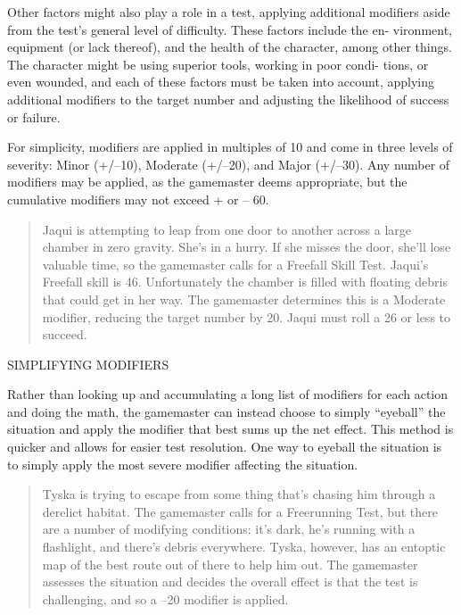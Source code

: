 Other factors might also play a
role in a test, applying additional
modifiers aside from the test's
general level of difficulty. These factors include the en-
vironment, equipment (or lack thereof), and the health
of the character, among other things. The character
might be using superior tools, working in poor condi-
tions, or even wounded, and each of these factors must
be taken into account, applying additional modifiers
to the target number and adjusting the likelihood of
success or failure.

For simplicity, modifiers are applied in multiples of
10 and come in three levels of severity: Minor (+/–10),
Moderate (+/–20), and Major (+/–30). Any number of
modifiers may be applied, as the gamemaster deems
appropriate, but the cumulative modifiers may not
exceed + or – 60.

\begin{quotation}
  Jaqui is attempting to leap from one door to another across a large
  chamber in zero gravity. She's in a hurry. If she misses the door,
  she'll lose valuable time, so the gamemaster calls for a Freefall
  Skill Test. Jaqui's Freefall skill is 46. Unfortunately the chamber
  is filled with floating debris that could get in her way. The
  gamemaster determines this is a Moderate modifier, reducing the
  target number by 20. Jaqui must roll a 26 or less to succeed.
\end{quotation}

SIMPLIFYING MODIFIERS

Rather than looking up and accumulating a
long list of modifiers for each action and doing
the math, the gamemaster can instead choose
to simply “eyeball” the situation and apply the
modifier that best sums up the net effect. This
method is quicker and allows for easier test
resolution. One way to eyeball the situation is
to simply apply the most severe modifier affecting the situation.

\begin{quotation}
  Tyska is trying to escape from some thing that's chasing him through
  a derelict habitat. The gamemaster calls for a Freerunning Test, but
  there are a number of modifying conditions: it's dark, he's running
  with a flashlight, and there's debris everywhere. Tyska, however,
  has an entoptic map of the best route out of there to help him
  out. The gamemaster assesses the situation and decides the overall
  effect is that the test is challenging, and so a –20 modifier is
  applied.
\end{quotation}

